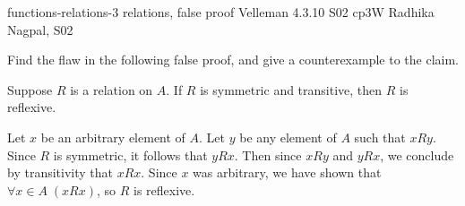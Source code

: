\problemdata      
        {functions-relations-3} %
        {relations, false proof} %
        {Velleman 4.3.10} %
        {S02 cp3W} %
        {Radhika Nagpal, S02} %

\begin{problem} 
Find the flaw in the following false proof, and give a counterexample
to the claim.

\begin{claim*}
Suppose $R$ is a relation on $A$. If $R$ is symmetric and transitive, 
then $R$ is reflexive.
\end{claim*}

\begin{falseproof}
Let $x$ be an arbitrary element of $A$.  Let $y$ be any element of $A$
such that $xRy$.  Since $R$ is symmetric, it follows that $yRx$.  Then
since $xRy$ and $yRx$, we conclude by transitivity that $xRx$.  Since
$x$ was arbitrary, we have shown that $\forall x \in A\; (xRx)$, so
$R$ is reflexive.
\end{falseproof}

\end{problem} 
